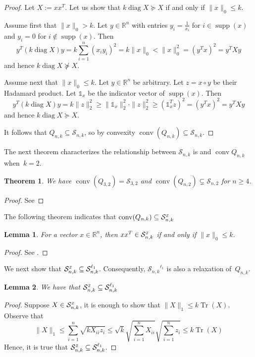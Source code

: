 \documentclass[11pt]{amsart}
\newcommand{\Szero}[2]{\ensuremath{\mathcal{S}_{#1,#2}}}
\newcommand{\Sone}[2]{\ensuremath{\mathcal{S}_{#1,#2}^{\ell_1}}}
\newcommand{\Sz}[2]{\ensuremath{\mathcal{S}_{#1,#2}^{\textit{\tiny{Z}}}}}
\theoremstyle{plain}
\newtheorem{thm}{Theorem}[section]
\newtheorem{lem}{Lemma}[section]
\theoremstyle{definition}
\theoremstyle{remark}
\newcommand{\RR}{\mathbb{R}}
\DeclareMathOperator{\conv}{conv}
\DeclareMathOperator{\diag}{diag}
\DeclareMathOperator{\tr}{Tr}
\DeclareMathOperator{\supp}{supp}
\begin{document}
	\begin{proof}
		Let $X:=xx^T$.
		Let us show that $k \diag X\succeq X$ if and only if $\|x\|_0 \leq k$.
		
		Assume first that $\|x\|_0 > k$.
		Let $y \in \RR^n$ with entries
		$y_i = \frac{1}{x_i}$ for $i \in \supp(x)$
		and $y_i = 0$ for $i \notin \supp(x)$.
		Then
		\[
		y^T (k \diag X) y =
		k\sum_{i=1}^n (x_iy_i)^2
		= k \|x\|_0
		< \|x\|_0^2 = (y^Tx)^2
		= y^T X y
		\]
		and hence \(k \diag X \not\succeq X\).
		
		Assume next that $\|x\|_0 \leq k$.
		Let $y \in \RR^n$ be arbitrary.
		Let \(z = x \circ y\) be their Hadamard product.
		Let \(\mathds{1}_x\) be the indicator vector of $\supp(x)$.
		Then
		\[
		y^T (k \diag X) y
		= k \|z\|_2^2
		\geq \|\mathds{1}_x\|_2^2 \cdot \|z\|_2^2 \geq (\mathds{1}_x^T z)^2 = (y^Tx)^2
		= y^T X y
		\]
		and hence \(k \diag X\succeq X\).
		
		
		It follows that $Q_{n,k} \subseteq \Szero{n}{k}$,
		so by convexity
		$\conv(Q_{n,k}) \subseteq \Szero{n}{k}$.
	\end{proof}
	
	
	The next theorem characterizes the relationship between $\Szero{n}{k}$ is and \(\conv Q_{n,k}\) when~$k=2$.
	
	\begin{thm}\label{thm:special_case_n3_k2}
		We have \(\conv(Q_{3,2}) = \Szero{3}{2}\) and
		\( \conv(Q_{n,2}) \subsetneq \Szero{n}{2}\) for $n \geq 4$.
	\end{thm}
    
	\begin{proof}
		See 
	\end{proof}
	
	The following theorem indicates that \(\conv(Q_{n,k}) \subseteq \Sz{n}{k}\)
	\begin{lem}\label{lem:Sz_rank_one}
		For a vector \(x \in \RR^n\), then \(xx^T\in \Sz{n}{k}\) if and only if \(\|x\|_0 \leq k\).
	\end{lem}
    
	\begin{proof}
		See .
	\end{proof}
	
	We next show that \(\Sz{n}{k} \subseteq \Sone{n}{k}\). Consequently, $\Szero{n}{k}^{\ell_1}$ is also a relaxation of~$Q_{n,k}$.
	
	\begin{lem}\label{lem:Q_subset_Sone}
		We have that
		\(
		\Sz{n}{k} \subseteq \Sone{n}{k} 
		\) 
	\end{lem}
	\begin{proof}
		Suppose \(X \in \Sz{n}{k}\), it is enough to show that \(\|X\|_1\leq k\tr(X)\). Observe that
		\begin{equation*}
			\|X\|_1 \leq \sum_{i=1}^n\sqrt{kX_{ii} z_i}\leq \sqrt{k} \sqrt{\textstyle \sum_{i=1}^n X_{ii}} \sqrt{\textstyle\sum_{i=1}^n z_i} \leq k \tr(X)
		\end{equation*}
		Hence, it is true that $\Sz{n}{k} \subseteq \Sone{n}{k}$.
	\end{proof}
	
\end{document}

